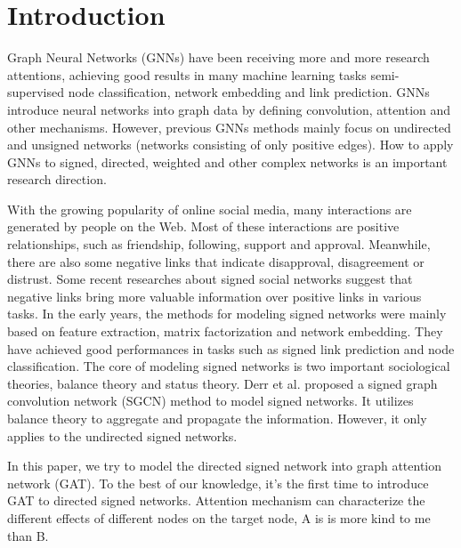 \documentclass[runningheads]{llncs}
\begin{document}
\section{Introduction}\label{sec:introduction}


Graph Neural Networks (GNNs) have been receiving more and more research attentions, achieving good results in many machine learning tasks \eg semi-supervised node classification\cite{kipf2016semi}, network embedding\cite{kipf2016variational} and link prediction.  
GNNs introduce neural networks into graph data by defining convolution\cite{kipf2016semi}, attention\cite{velickovic2017graph} and other mechanisms. 
However, previous GNNs methods mainly focus on undirected and unsigned networks (\ie networks consisting of only positive edges). 
How to apply GNNs to signed, directed, weighted and other complex networks is an important research direction. 

With the growing popularity of online social media, many interactions are generated by people on the Web. 
Most of these interactions are positive relationships, such as friendship, following, support and approval. 
Meanwhile, there are also some negative links that indicate disapproval, disagreement or distrust.
Some recent researches about signed social networks suggest that negative links bring more valuable information over positive links in various tasks\cite{leskovec2010predicting}. 
In the early years, the methods for modeling signed networks were mainly based on feature extraction\cite{leskovec2010predicting}, matrix factorization\cite{hsieh2012low} and network embedding\cite{wang2017signed,kim2018side, sodhani2019attending}. They have achieved good performances in tasks such as signed link prediction and node classification. 
The core of modeling signed networks is two important sociological theories, \ie balance theory and status theory. 
Derr et al.\cite{derr2018signed} proposed a signed graph convolution network (SGCN) method to model signed networks. 
It utilizes balance theory to aggregate and propagate the information. 
However, it only applies to the undirected signed networks.




In this paper, we try to model the directed signed network into graph attention network (GAT).
To the best of our knowledge, it's the first time to introduce GAT to directed signed networks. Attention mechanism can characterize the different effects of different nodes on the target node, \eg A is is more kind to me than B.
\end{document}
